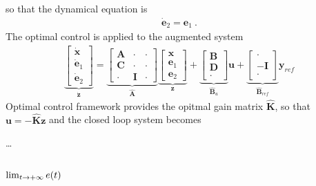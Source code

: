 \documentclass[letterpaper,10pt,english]{jupyterBook}
\begin{document}
\sphinxAtStartPar
so that the dynamical equation is
\begin{equation*}
\begin{split}\dot{\mathbf{e}}_2 = \mathbf{e}_1 \ .\end{split}
\end{equation*}
\sphinxAtStartPar
The optimal control is applied to the augmented system
\begin{equation*}
\begin{split}\underbrace{\begin{bmatrix} \dot{\mathbf{x}} \\ \dot{\mathbf{e}}_1 \\ \dot{\mathbf{e}}_2 \end{bmatrix}}_{\dot{\mathbf{z}}} = \underbrace{\begin{bmatrix} \mathbf{A} & \cdot & \cdot \\ \mathbf{C} & \cdot & \cdot \\ \cdot & \mathbf{I} & \cdot \end{bmatrix}}_{\hat{\mathbf{A}}} \underbrace{\begin{bmatrix} \mathbf{x} \\ \mathbf{e}_1 \\ \mathbf{e}_2 \end{bmatrix}}_{\mathbf{z}} + \underbrace{\begin{bmatrix} \mathbf{B} \\ \mathbf{D} \\ \cdot \end{bmatrix}}_{\hat{\mathbf{B}}_u} \mathbf{u} + \underbrace{\begin{bmatrix} \cdot \\ -\mathbf{I} \\ \cdot \end{bmatrix}}_{\hat{\mathbf{B}}_{ref}} \mathbf{y}_{ref}\end{split}
\end{equation*}
\sphinxAtStartPar
Optimal control framework provides the opitmal gain matrix \(\hat{\mathbf{K}}\), so that \(\mathbf{u} = - \hat{\mathbf{K}} \mathbf{z}\) and the closed loop system becomes

\sphinxAtStartPar
…
\subsubsection*{\protect\(\lim_{t \rightarrow +\infty} e(t)\protect\)}
\end{document}
